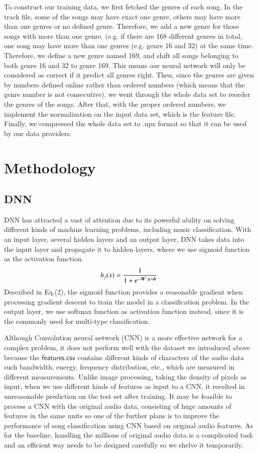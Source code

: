 \documentclass{article}
\def\mathbi#1{\textbf{\em #1}}
\begin{document}
To construct our training data, we first fetched the genres of each song. In the track file, some of the songs may have exact one genre, others may have more than one genres or no defined genre. Therefore, we add a new genre for those songs with more than one genre. (e.g. if there are 168 different genres in total, one song may have more than one genres (e.g. genre 16 and 32) at the same time. Therefore, we define a new genre named 169, and shift all songs belonging to both genre 16 and 32 to genre 169. This means our neural network will only be considered as correct if it predict all genres right. Then, since the genres are given by numbers defined online rather than ordered numbers (which means that the genre number is not consecutive), we went through the whole data set to reorder the genres of the songs. After that, with the proper ordered numbers, we implement the normalization on the input data set, which is the feature file. Finally, we compressed the whole data set to .npz format so that it can be used by our data providers.

\section{Methodology}
\subsection{DNN}
DNN has attracted a vast of attention due to its powerful ability on solving different kinds of machine learning problems, including music classification. With an input layer, several hidden layers and an output layer, DNN takes data into the input layer and propagate it to hidden layers, where we use sigmoid function as the activation function.
\begin{equation}
	h_ j (x) =  \frac{\mathrm{1} }{\mathrm{1} + e^{- \mathbi{W}^\top \mathbi{x} + \mathbi{b} }}
\end{equation}
Described in Eq.(2), the sigmoid function provides a reasonable gradient when processing gradient descent to train the model in a classification problem. In the output layer, we use softmax function as activation function instead, since it is the commonly used for multi-type classification. 

Although Convolution neural network (CNN) is a more effective network for a complex problem, it does not perform well with the dataset we introduced above because the $\mathsf{features.csv}$ contains different kinds of characters of the audio data such bandwidth, energy, frequency distribution, etc., which are measured in different measurements. Unlike image processing, taking the density of pixels as input, when we use different kinds of features as input to a CNN, it resulted in unreasonable prediction on the test set after training. It may be feasible to process a CNN with the original audio data, consisting of huge amounts of features in the same units so one of the further plans is to improve the performance of song classification using CNN based on original audio features. As for the baseline, handling the millions of original audio data is a complicated task and an efficient way needs to be designed carefully so we shelve it temporarily. 
\end{document}
